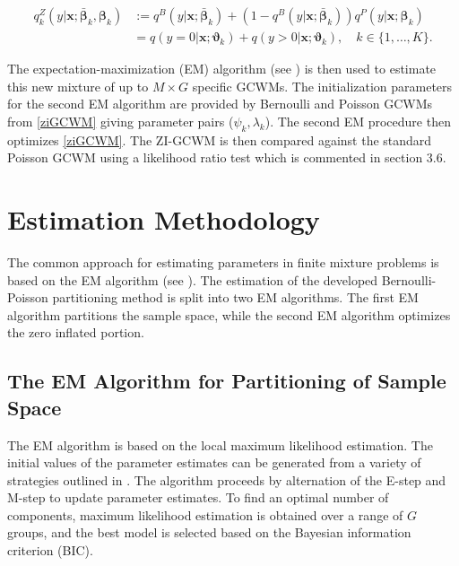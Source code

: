 \documentclass[11pt,letterpaper]{article}
\numberwithin{equation}{section}
\numberwithin{equation}{section}
\numberwithin{equation}{section}
\begin{document}
\begin{align}
q^Z_{k}(y|\bm{x};  \bm{\bar{\beta}}_k,\bm{ \beta}_k) & := q^B(y|\bm{x}; \bm{\bar{\beta}}_k) +(1-  q^B(y|\bm{x}; \bm{\bar{\beta}}_k) ) q^P(y|\bm{x};\bm{\beta}_k) \nonumber \\
& = q(y = 0|\bm{x};\bm{\vartheta}_{k} ) +  q(y > 0|\bm{x} ; \bm{\vartheta}_{k}), \quad k \in \{1 ,\ldots, K \}.
\label{ziGCWM}
\end{align}


The expectation-maximization (EM) algorithm (see \cite{Dempster+Laird+Rubin:1977}) is then used to estimate this new mixture of up to $M \times G$ specific GCWMs. The initialization parameters for the second EM algorithm are provided by Bernoulli and Poisson GCWMs from \eqref{ziGCWM} giving parameter pairs ($ \psi_k,\lambda_k  $). The second EM procedure then optimizes \eqref{ziGCWM}. The ZI-GCWM is then compared against the standard Poisson GCWM using a likelihood ratio test which is commented in section 3.6.

\section{Estimation Methodology}
The common approach for estimating parameters in finite mixture problems is based on the EM algorithm (see \cite{McLachlan+Peel:2000}).
The estimation of the developed Bernoulli-Poisson partitioning method is split into two EM algorithms. The first EM algorithm partitions the sample space, while the second EM algorithm optimizes the zero inflated portion.
 \subsection{The EM Algorithm for Partitioning of Sample Space}

The EM algorithm is based on the local  maximum likelihood estimation. %
The initial values of the parameter estimates can be generated from a variety of strategies outlined in \cite{initialPaperGrassiaRef}. %
 The algorithm proceeds by alternation of the E-step and M-step to update parameter estimates. %
To find an optimal number of components, maximum likelihood estimation is obtained over a range of $G$ groups, and the best model is selected based on the Bayesian information criterion (BIC).   %
\end{document}

